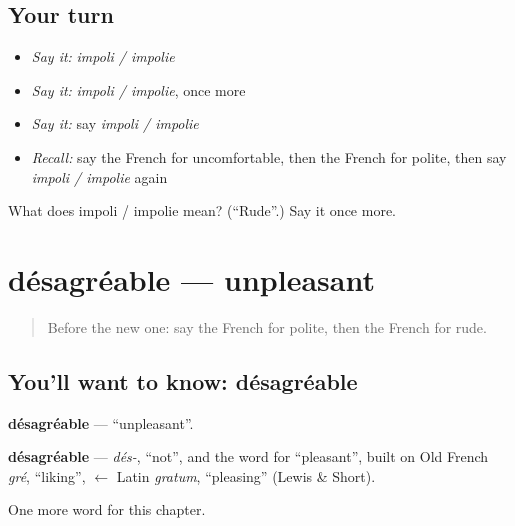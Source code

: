 \subsection*{Your turn}
\begin{itemize}
\raggedright
  \item \emph{Say it:} \emph{impoli / impolie}
  \item \emph{Say it:} \emph{impoli / impolie}, once more
  \item \emph{Say it:} say \emph{impoli / impolie}
  \item \emph{Recall:} say the French for uncomfortable, then the French for polite, then say \emph{impoli / impolie} again
\end{itemize}

\begin{tcolorbox}[breakable,colback=teal!4,colframe=teal!35!black,title={Before you move on}]
What does impoli / impolie mean? (\textquotedblleft{}Rude\textquotedblright{}.) Say it once more.
\end{tcolorbox}
\section[désagréable]{désagréable — unpleasant}

\label{lesson:FR-C159-desagreable}



\begin{quote}
Before the new one: say the French for polite, then the French for rude.
\end{quote}

\subsection*{You'll want to know: désagréable}
\textbf{désagréable} — \textquotedblleft{}unpleasant\textquotedblright{}.

\begin{cousinweb}
\textbf{désagréable} — \emph{dés-}, \textquotedblleft{}not\textquotedblright{}, and the word for \textquotedblleft{}pleasant\textquotedblright{}, built on Old French \emph{gré}, \textquotedblleft{}liking\textquotedblright{}, $\leftarrow$ Latin \emph{gratum}, \textquotedblleft{}pleasing\textquotedblright{} (Lewis \& Short).
\end{cousinweb}

\begin{grammarlens}[title={What you've built}]
One more word for this chapter.
\end{grammarlens}

